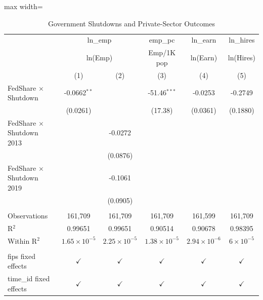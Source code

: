 
\begin{table}[htbp]
   \caption{\label{tab:main} Government Shutdowns and Private-Sector Outcomes}
   \bigskip
   \centering
   \begin{adjustbox}{max width=\textwidth}
   \begin{tabular}{lccccc}
      \toprule
       & \multicolumn{2}{c}{ln\_emp} & emp\_pc & ln\_earn & ln\_hires\\
       & \multicolumn{2}{c}{ln(Emp)} & Emp/1K pop & ln(Earn) & ln(Hires) \\ 
                                       & (1)                   & (2)                   & (3)                   & (4)                   & (5)\\  
      \midrule 
      FedShare $\times$ Shutdown       & -0.0662$^{**}$        &                       & -51.46$^{***}$        & -0.0253               & -0.2749\\   
                                       & (0.0261)              &                       & (17.38)               & (0.0361)              & (0.1880)\\   
      FedShare $\times$ Shutdown 2013  &                       & -0.0272               &                       &                       &   \\   
                                       &                       & (0.0876)              &                       &                       &   \\   
      FedShare $\times$ Shutdown 2019  &                       & -0.1061               &                       &                       &   \\   
                                       &                       & (0.0905)              &                       &                       &   \\   
       \\
      Observations                     & 161,709               & 161,709               & 161,709               & 161,599               & 161,709\\  
      R$^2$                            & 0.99651               & 0.99651               & 0.90514               & 0.90678               & 0.98395\\  
      Within R$^2$                     & $1.65\times 10^{-5}$  & $2.25\times 10^{-5}$  & $1.38\times 10^{-5}$  & $2.94\times 10^{-6}$  & $6\times 10^{-5}$\\   
       \\
      fips fixed effects               & $\checkmark$          & $\checkmark$          & $\checkmark$          & $\checkmark$          & $\checkmark$\\   
      time\_id fixed effects           & $\checkmark$          & $\checkmark$          & $\checkmark$          & $\checkmark$          & $\checkmark$\\   
      \bottomrule
   \end{tabular}
   \end{adjustbox}
   

\end{table}
